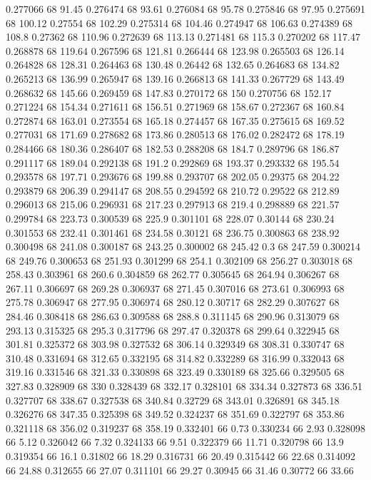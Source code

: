 0.277066 68 91.45
0.276474 68 93.61
0.276084 68 95.78
0.275846 68 97.95
0.275691 68 100.12
0.27554 68 102.29
0.275314 68 104.46
0.274947 68 106.63
0.274389 68 108.8
0.27362 68 110.96
0.272639 68 113.13
0.271481 68 115.3
0.270202 68 117.47
0.268878 68 119.64
0.267596 68 121.81
0.266444 68 123.98
0.265503 68 126.14
0.264828 68 128.31
0.264463 68 130.48
0.26442 68 132.65
0.264683 68 134.82
0.265213 68 136.99
0.265947 68 139.16
0.266813 68 141.33
0.267729 68 143.49
0.268632 68 145.66
0.269459 68 147.83
0.270172 68 150
0.270756 68 152.17
0.271224 68 154.34
0.271611 68 156.51
0.271969 68 158.67
0.272367 68 160.84
0.272874 68 163.01
0.273554 68 165.18
0.274457 68 167.35
0.275615 68 169.52
0.277031 68 171.69
0.278682 68 173.86
0.280513 68 176.02
0.282472 68 178.19
0.284466 68 180.36
0.286407 68 182.53
0.288208 68 184.7
0.289796 68 186.87
0.291117 68 189.04
0.292138 68 191.2
0.292869 68 193.37
0.293332 68 195.54
0.293578 68 197.71
0.293676 68 199.88
0.293707 68 202.05
0.29375 68 204.22
0.293879 68 206.39
0.294147 68 208.55
0.294592 68 210.72
0.29522 68 212.89
0.296013 68 215.06
0.296931 68 217.23
0.297913 68 219.4
0.298889 68 221.57
0.299784 68 223.73
0.300539 68 225.9
0.301101 68 228.07
0.30144 68 230.24
0.301553 68 232.41
0.301461 68 234.58
0.30121 68 236.75
0.300863 68 238.92
0.300498 68 241.08
0.300187 68 243.25
0.300002 68 245.42
0.3 68 247.59
0.300214 68 249.76
0.300653 68 251.93
0.301299 68 254.1
0.302109 68 256.27
0.303018 68 258.43
0.303961 68 260.6
0.304859 68 262.77
0.305645 68 264.94
0.306267 68 267.11
0.306697 68 269.28
0.306937 68 271.45
0.307016 68 273.61
0.306993 68 275.78
0.306947 68 277.95
0.306974 68 280.12
0.30717 68 282.29
0.307627 68 284.46
0.308418 68 286.63
0.309588 68 288.8
0.311145 68 290.96
0.313079 68 293.13
0.315325 68 295.3
0.317796 68 297.47
0.320378 68 299.64
0.322945 68 301.81
0.325372 68 303.98
0.327532 68 306.14
0.329349 68 308.31
0.330747 68 310.48
0.331694 68 312.65
0.332195 68 314.82
0.332289 68 316.99
0.332043 68 319.16
0.331546 68 321.33
0.330898 68 323.49
0.330189 68 325.66
0.329505 68 327.83
0.328909 68 330
0.328439 68 332.17
0.328101 68 334.34
0.327873 68 336.51
0.327707 68 338.67
0.327538 68 340.84
0.32729 68 343.01
0.326891 68 345.18
0.326276 68 347.35
0.325398 68 349.52
0.324237 68 351.69
0.322797 68 353.86
0.321118 68 356.02
0.319237 68 358.19
0.332401 66 0.73
0.330234 66 2.93
0.328098 66 5.12
0.326042 66 7.32
0.324133 66 9.51
0.322379 66 11.71
0.320798 66 13.9
0.319354 66 16.1
0.31802 66 18.29
0.316731 66 20.49
0.315442 66 22.68
0.314092 66 24.88
0.312655 66 27.07
0.311101 66 29.27
0.30945 66 31.46
0.30772 66 33.66
